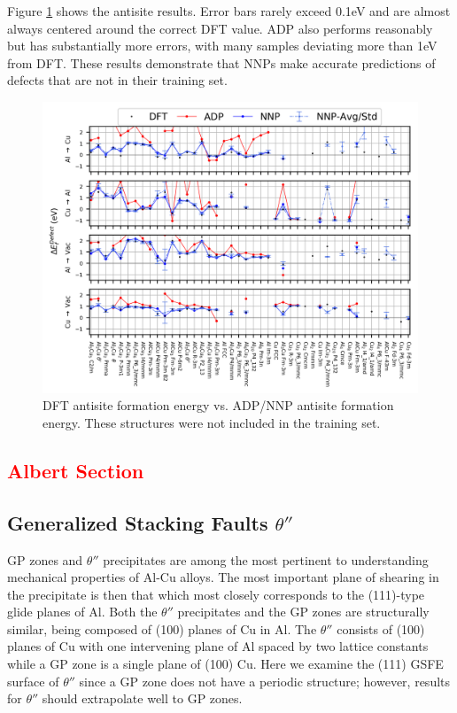 \documentclass{article}
\begin{document}
Figure \ref{fig:antisite_plot} shows the antisite results.
Error bars rarely exceed 0.1eV and are almost always centered around the correct DFT value.
ADP also performs reasonably but has substantially more errors, with many samples deviating more than 1eV from DFT.
These results demonstrate that NNPs make accurate predictions of defects that are not in their training set. 

\begin{figure}[H]%
\centering%
\includegraphics[width=1\textwidth,center]{figures/antisite_vacancies.png}%
\caption{DFT antisite formation energy vs. ADP/NNP antisite formation energy.
These structures were not included in the training set.}%
\label{fig:antisite_plot}
\end{figure}


\textcolor{red}{\subsection{Albert Section}} \label{sct:thetap_theta_transition}

\subsection{Generalized Stacking Faults $\theta''$} \label{sct:gsf_theta_dp}

GP zones and $\theta''$ precipitates are among the most pertinent to understanding mechanical properties of Al-Cu alloys\cite{Nie2014PhysicalAlloys}. 
The most important plane of shearing in the precipitate is then that which most closely corresponds to the (111)-type glide planes of Al.
Both the $\theta''$ precipitates and the GP zones are structurally similar, being composed of (100) planes of Cu in Al. 
The $\theta''$ consists of (100) planes of Cu with one intervening plane of Al spaced by two lattice constants while a GP zone is a single plane of (100) Cu. Here we examine the (111) GSFE surface of $\theta''$ since a GP zone does not have a periodic structure; however, results for $\theta''$ should extrapolate well to GP zones.
\end{document}
